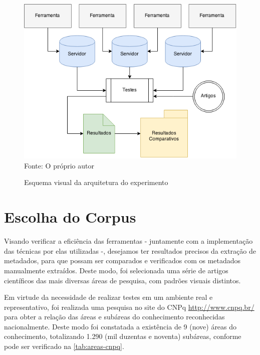\begin{figure}[h!]
    \centering
    \caption{Esquema visual da arquitetura do experimento}
    \label{fig:metodology}
    \includegraphics[width=0.8\linewidth]{./assets/images/metodology}
    \center\footnotesize{Fonte: O próprio autor}
\end{figure}


\section{Escolha do Corpus}
\label{sec:corpus}


Visando verificar a eficiência das ferramentas - juntamente com a implementação das técnicas por elas utilizadas -, desejamos ter resultados precisos da extração de metadados, para que possam ser comparados e verificados com os metadados manualmente extraídos. Deste modo, foi selecionada uma série de artigos científicos das mais diversas áreas de pesquisa, com padrões visuais distintos.


Em virtude da necessidade de realizar testes em um ambiente real e representativo, foi realizada uma pesquisa no site do CNPq \url{http://www.cnpq.br/} para obter a relação das áreas e subáreas do conhecimento reconhecidas nacionalmente. Deste modo foi constatada a existência de 9 (nove) áreas do conhecimento, totalizando 1.290 (mil duzentas e noventa) subáreas, conforme pode ser verificado na \autoref{tab:areas-cnpq}.

